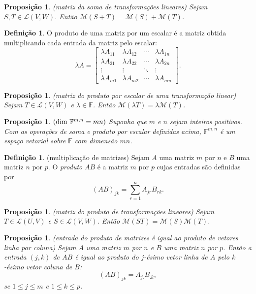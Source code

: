 \documentclass[12pt]{article}
\theoremstyle{plain}
\newtheorem{prop}[thm]{Proposição}
\theoremstyle{definition}
\newtheorem{defn}[thm]{Definição}
\theoremstyle{remark}
\begin{document}
\begin{prop} (matriz da soma de transformações lineares)
    Sejam \(S, T \in \mathcal{L}(V, W)\). Então \(\mathcal{M}(S + T) = \mathcal{M}(S) + \mathcal{M}(T)\).
\end{prop}

\begin{defn}
    O produto de uma matriz por um escalar é a matriz obtida multiplicando cada entrada da matriz pelo escalar:
    \[
        \lambda A = \begin{bmatrix}
            \lambda A_{11} & \lambda A_{12} & \cdots & \lambda A_{1n} \\
            \lambda A_{21} & \lambda A_{22} & \cdots & \lambda A_{2n} \\
            \vdots & \vdots & \ddots & \vdots \\
            \lambda A_{m1} & \lambda A_{m2} & \cdots & \lambda A_{mn}
        \end{bmatrix}.
    \]
\end{defn}

\begin{prop} (matriz do produto por escalar de uma transformação linear)
    Sejam \(T \in \mathcal{L}(V, W)\) e \(\lambda \in \mathbb{F}\). Então \(\mathcal{M}(\lambda T) = \lambda \mathcal{M}(T)\).
\end{prop}

\begin{prop} \((\textup{dim } \mathbb{F}^{m,n} = mn)\)
    Suponha que \(m\) e \(n\) sejam inteiros positivos. Com as operações de soma e produto por escalar definidas acima, \(\mathbb{F}^{m,n}\) é um espaço vetorial sobre \(\mathbb{F}\) com dimensão \(mn\).    
\end{prop}

\begin{defn} (multiplicação de matrizes)
    Sejam \(A\) uma matriz \(m\) por \(n\) e \(B\) uma matriz \(n\) por \(p\). O \emph{produto} \(AB\) é a matriz \(m\) por \(p\) cujas entradas são definidas por
    \[
        (AB)_{jk} = \sum_{r=1}^{n} A_{jr} B_{rk}.
    \]
\end{defn}

\begin{prop} (matriz do produto de transformações lineares)
    Sejam \(T \in \mathcal{L}(U, V)\) e \(S \in \mathcal{L}(V, W)\). Então \(\mathcal{M}(ST) = \mathcal{M}(S) \mathcal{M}(T)\).
\end{prop}

\begin{prop} (entrada do produto de matrizes é igual ao produto de vetores linha por coluna)
    Sejam \(A\) uma matriz \(m\) por \(n\) e \(B\) uma matriz \(n\) por \(p\). Então a entrada \((j, k)\) de \(AB\) é igual ao produto do \(j\)-ésimo vetor linha de \(A\) pelo \(k\)-ésimo vetor coluna de \(B\):
    \[
        (AB)_{jk} = A_{j.} B_{.k},
    \]
    \noindent se \(1 \leq j \leq m\) e \(1 \leq k \leq p\).
\end{prop}
\end{document}
